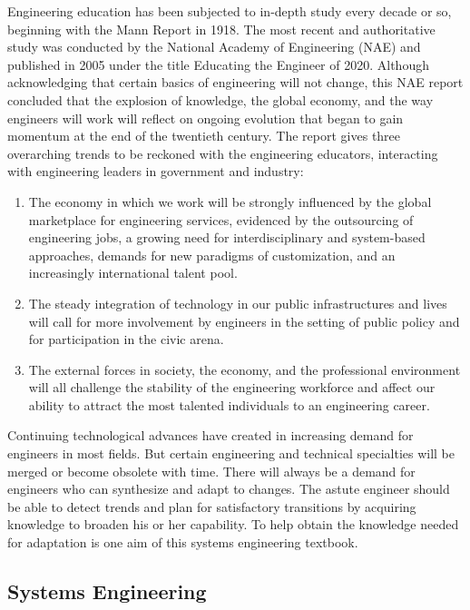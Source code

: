 Engineering education has been subjected to in-depth study every decade or so, beginning with the Mann Report in 1918. The most recent and authoritative study was conducted by the National Academy of Engineering (NAE) and published in 2005 under the title Educating the Engineer of 2020.
Although acknowledging that certain basics of engineering will not change, this NAE report concluded that the explosion of knowledge, the global economy, and the way engineers will work will reflect on ongoing evolution that began to gain momentum at the end of the twentieth century. The report gives three overarching trends to be reckoned with the engineering educators, interacting with engineering leaders in government and industry:

\begin{enumerate}
\item The economy in which we work will be strongly influenced by the global marketplace for engineering services, evidenced by the outsourcing of engineering jobs, a growing need for interdisciplinary and system-based approaches, demands for new paradigms of customization, and an increasingly international talent pool.
\item The steady integration of technology in our public infrastructures and lives will call for more involvement by engineers in the setting of public policy and for participation in the civic arena.
\item The external forces in society, the economy, and the professional environment will all challenge the stability of the engineering workforce and affect our ability to attract the most talented individuals to an engineering career.
\end{enumerate}

Continuing technological advances have created in increasing demand for engineers in most fields. But certain engineering and technical specialties will be merged or become obsolete with time. There will always be a demand for engineers who can synthesize and adapt to changes. The astute engineer should be able to detect trends and plan for satisfactory transitions by acquiring knowledge to broaden his or her capability. To help obtain the knowledge needed for adaptation is one aim of this systems engineering textbook.

\subsection{Systems Engineering}

